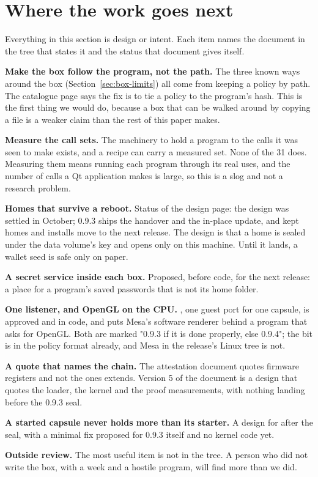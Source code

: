 \section{Where the work goes next}\label{sec:next}

Everything in this section is design or intent. Each item names the document in the tree that states it and the status that document gives itself.

\textbf{Make the box follow the program, not the path.} The three known ways around the box (Section~\ref{sec:box-limits}) all come from keeping a policy by path. The catalogue page says the fix is to tie a policy to the program's hash. This is the first thing we would do, because a box that can be walked around by copying a file is a weaker claim than the rest of this paper makes.

\textbf{Measure the call sets.} The machinery to hold a program to the calls it was seen to make exists, and a recipe can carry a measured set. None of the 31 does. Measuring them means running each program through its real uses, and the number of calls a Qt application makes is large, so this is a slog and not a research problem.

\textbf{Homes that survive a reboot.} Status of the design page: the design was settled in October; 0.9.3 ships the handover and the in-place update, and kept homes and installs move to the next release. The design is that a home is sealed under the data volume's key and opens only on this machine. Until it lands, a wallet seed is safe only on paper.

\textbf{A secret service inside each box.} Proposed, before code, for the next release: a place for a program's saved passwords that is not its home folder.

\textbf{One listener, and OpenGL on the CPU.} , one guest port for one capsule, is approved and in code, and  puts Mesa's software renderer behind a program that asks for OpenGL. Both are marked "0.9.3 if it is done properly, else 0.9.4"; the  bit is in the policy format already, and Mesa in the release's Linux tree is not.

\textbf{A quote that names the \nonos{} chain.} The attestation document quotes firmware registers and not the ones \nonos{} extends. Version 5 of the document is a design that quotes the loader, the kernel and the proof measurements, with nothing landing before the 0.9.3 seal.

\textbf{A started capsule never holds more than its starter.} A design for after the seal, with a minimal fix proposed for 0.9.3 itself and no kernel code yet.

\textbf{Outside review.} The most useful item is not in the tree. A person who did not write the box, with a week and a hostile program, will find more than we did.
